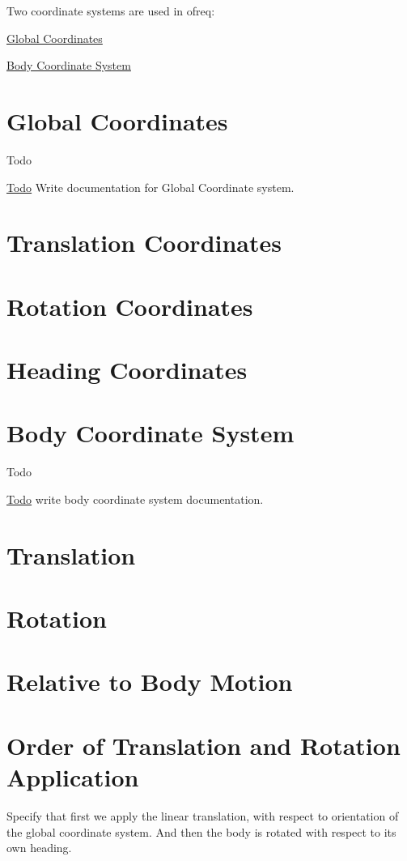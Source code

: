 Two coordinate systems are used in ofreq\-:

\hyperlink{global_coordinates}{Global Coordinates}

\hyperlink{body_coordinates}{Body Coordinate System} \hypertarget{global_coordinates}{}\section{Global Coordinates}\label{global_coordinates}
\begin{DoxyRefDesc}{Todo}
\item[\hyperlink{todo__todo000004}{Todo}]Write documentation for Global Coordinate system.\end{DoxyRefDesc}


\section*{Translation Coordinates}

\section*{Rotation Coordinates}

\section*{Heading Coordinates}\hypertarget{body_coordinates}{}\section{Body Coordinate System}\label{body_coordinates}
\begin{DoxyRefDesc}{Todo}
\item[\hyperlink{todo__todo000003}{Todo}]write body coordinate system documentation.\end{DoxyRefDesc}


\section*{Translation}

\section*{Rotation}

\section*{Relative to Body Motion}

\section*{Order of Translation and Rotation Application}

Specify that first we apply the linear translation, with respect to orientation of the global coordinate system. And then the body is rotated with respect to its own heading. 